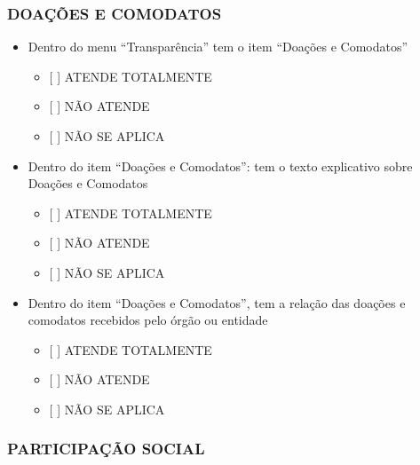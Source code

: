 \documentclass[]{book}
\providecommand{\tightlist}{%
  \setlength{\itemsep}{0pt}\setlength{\parskip}{0pt}}
\begin{document}
\hypertarget{doauxe7uxf5es-e-comodatos-1}{%
\subsubsection*{DOAÇÕES E COMODATOS}\label{doauxe7uxf5es-e-comodatos-1}}

\begin{itemize}
\tightlist
\item
  Dentro do menu ``Transparência'' tem o item ``Doações e Comodatos''

  \begin{itemize}
  \tightlist
  \item
    {[} {]} ATENDE TOTALMENTE
  \item
    {[} {]} NÃO ATENDE
  \item
    {[} {]} NÃO SE APLICA
  \end{itemize}
\item
  Dentro do item ``Doações e Comodatos'': tem o texto explicativo sobre Doações e Comodatos

  \begin{itemize}
  \tightlist
  \item
    {[} {]} ATENDE TOTALMENTE
  \item
    {[} {]} NÃO ATENDE
  \item
    {[} {]} NÃO SE APLICA
  \end{itemize}
\item
  Dentro do item ``Doações e Comodatos'', tem a relação das doações e comodatos recebidos pelo órgão ou entidade

  \begin{itemize}
  \tightlist
  \item
    {[} {]} ATENDE TOTALMENTE
  \item
    {[} {]} NÃO ATENDE
  \item
    {[} {]} NÃO SE APLICA
  \end{itemize}
\end{itemize}

\hypertarget{participauxe7uxe3o-social-1}{%
\subsubsection*{PARTICIPAÇÃO SOCIAL}\label{participauxe7uxe3o-social-1}}
\end{document}
